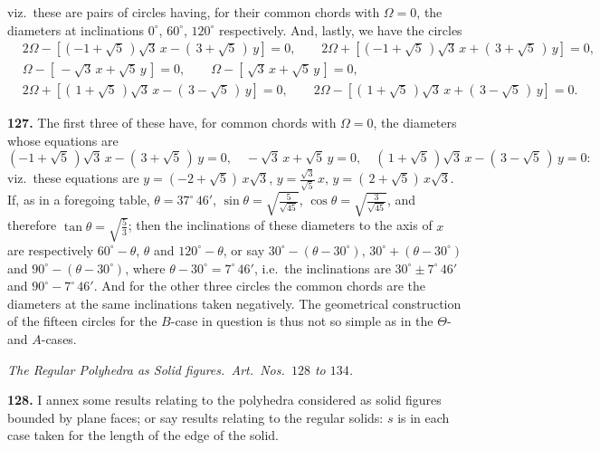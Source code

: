 \documentclass[11pt]{article}
\newcommand{\artno}[1]{\textbf{#1.}\quad}
\begin{document}
\bigskip
\noindent
viz.\ these are pairs of circles having, for their common chords with
$\Omega = 0$, the diameters at inclinations $0^{\circ}$, $60^{\circ}$,
$120^{\circ}$ respectively. And, lastly, we have the circles
\begin{align*}
  &2\Omega - [(-1 + \sqrt{5}\,)\sqrt{3}\,x - (\,3 + \sqrt{5}\,)\,y] = 0,
   \qquad 2\Omega + [(-1 + \sqrt{5}\,)\sqrt{3}\,x + (\,3 + \sqrt{5}\,)\,y] = 0,\\
  &\Omega - [\,-\sqrt{3}\,x + \sqrt{5}\,y\,] = 0,
   \qquad \Omega - [\,\sqrt{3}\,x + \sqrt{5}\,y\,] = 0,\\
  &2\Omega + [(\,1 + \sqrt{5}\,)\sqrt{3}\,x - (\,3 - \sqrt{5}\,)\,y] = 0,
   \qquad 2\Omega - [(\,1 + \sqrt{5}\,)\sqrt{3}\,x + (\,3 - \sqrt{5}\,)\,y] = 0.
\end{align*}

\medskip
\noindent
\artno{127} The first three of these have, for common chords with
$\Omega = 0$, the diameters whose equations are
\[
  (-1 + \sqrt{5}\,)\sqrt{3}\,x - (\,3 + \sqrt{5}\,)\,y = 0,\quad
  -\sqrt{3}\,x + \sqrt{5}\,y = 0,\quad
  (\,1 + \sqrt{5}\,)\sqrt{3}\,x - (\,3 - \sqrt{5}\,)\,y = 0:
\]
viz.\ these equations are
$y = (-2 + \sqrt{5})\,x\sqrt{3}$,
$y = \tfrac{\sqrt{3}}{\sqrt{5}}\,x$,
$y = (\,2 + \sqrt{5})\,x\sqrt{3}$. If, as in a foregoing table,
$\theta = 37^{\circ}\,46'$, $\sin\theta = \sqrt{\tfrac{5}{\sqrt{45}}}$,
$\cos\theta = \sqrt{\tfrac{3}{\sqrt{45}}}$, and therefore
$\tan\theta = \sqrt{\tfrac{5}{3}}$; then the inclinations of these diameters
to the axis of $x$ are respectively $60^{\circ} - \theta$, $\theta$ and
$120^{\circ} - \theta$, or say $30^{\circ} - (\theta - 30^{\circ})$,
$30^{\circ} + (\theta - 30^{\circ})$ and
$90^{\circ} - (\theta - 30^{\circ})$, where
$\theta - 30^{\circ} = 7^{\circ}\,46'$, i.e.\ the inclinations are
$30^{\circ} \pm 7^{\circ}\,46'$ and $90^{\circ} - 7^{\circ}\,46'$. And for
the other three circles the common chords are the diameters at the same
inclinations taken negatively. The geometrical construction of the fifteen
circles for the $B$-case in question is thus not so simple as in the
$\Theta$- and $A$-cases.

\bigskip
\begin{center}
\textit{The Regular Polyhedra as Solid figures.\ Art.\ Nos.\ $128$ to $134$.}
\end{center}

\medskip
\noindent
\artno{128} I annex some results relating to the polyhedra considered as
solid figures bounded by plane faces; or say results relating to the regular
solids: $s$ is in each case taken for the length of the edge of the solid.
\end{document}
